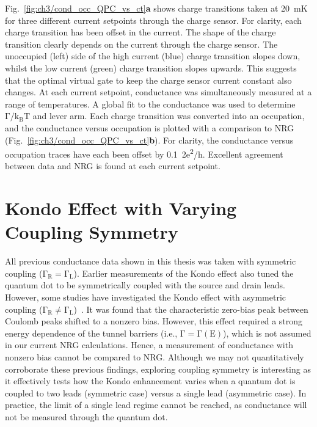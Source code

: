 Fig.~\ref{fig:ch3/cond_occ_QPC_vs_ct}\textbf{a} shows charge transitions taken at \qty{20}{mK} for three different current setpoints through the charge sensor. For clarity, each charge transition has been offset in the current. The shape of the charge transition clearly depends on the current through the charge sensor. The unoccupied (left) side of the high current (blue) charge transition slopes down, whilst the low current (green) charge transition slopes upwards. This suggests that the optimal virtual gate to keep the charge sensor current constant also changes. At each current setpoint, conductance was simultaneously measured at a range of temperatures. A global fit to the conductance was used to determine $\mathrm{\Gamma/k_BT}$ and lever arm. Each charge transition was converted into an occupation, and the conductance versus occupation is plotted with a comparison to NRG (Fig.~\ref{fig:ch3/cond_occ_QPC_vs_ct}\textbf{b}). For clarity, the conductance versus occupation traces have each been offset by \qty{0.1}{2e^2/h}. Excellent agreement between data and NRG is found at each current setpoint. 


\section{Kondo Effect with Varying Coupling Symmetry}

All previous conductance data shown in this thesis was taken with symmetric coupling ($\mathrm{\Gamma_R = \Gamma_L}$). Earlier measurements of the Kondo effect also tuned the quantum dot to be symmetrically coupled with the source and drain leads. However, some studies have investigated the Kondo effect with asymmetric coupling ($\mathrm{\Gamma_R \neq \Gamma_L}$)~\cite{kondo_asymmetric}. It was found that the characteristic zero-bias peak between Coulomb peaks shifted to a nonzero bias. However, this effect required a strong energy dependence of the tunnel barriers (i.e., $\mathrm{\Gamma = \Gamma(E)}$), which is not assumed in our current NRG calculations.
Hence, a measurement of conductance with nonzero bias cannot be compared to NRG. 
Although we may not quantitatively corroborate these previous findings, exploring coupling symmetry is interesting as it effectively tests how the Kondo enhancement varies when a quantum dot is coupled to two leads (symmetric case) versus a single lead (asymmetric case). In practice, the limit of a single lead regime cannot be reached, as conductance will not be measured through the quantum dot.


